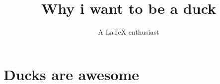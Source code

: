 \documentclass{book}
\author{A LaTeX enthusiast}
\title{Why i want to be a duck}
\begin{document}
\maketitle
\tableofcontents
\chapter{Ducks are awesome}
\end{document}
